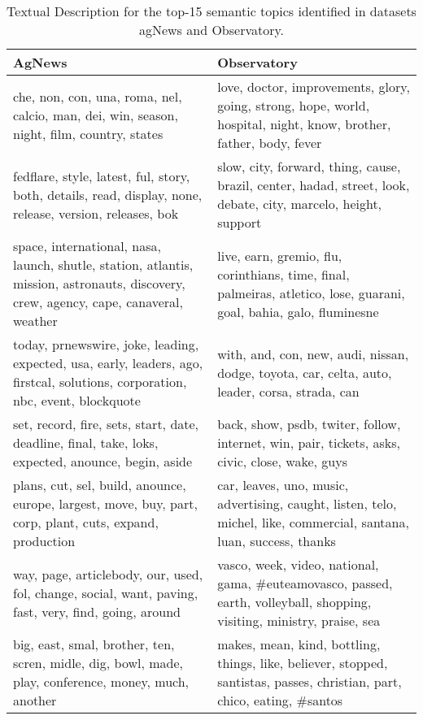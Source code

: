 \begin{table*}
\caption{Textual Description for the top-15 semantic topics identified in datasets agNews and Observatory.}\label{tbl:topicDescriptions}
\centering
	\begin{tiny}
	\begin{tabular}{|p{5.0cm}|p{5.0cm}|}\hline
		\textbf{AgNews}  & \textbf{Observatory} \\ \hline \hline
		
		che, non, con, una, roma, nel, calcio, man, dei, win, season, night, film, country, states  &  love, doctor, improvements, glory, going, strong, hope, world, hospital, night, know, brother, father, body, fever \\ \hline
		fedflare, style, latest, ful, story, both, details, read, display, none, release, version, releases, bok  &  slow, city, forward, thing, cause, brazil, center, hadad, street, look, debate, city, marcelo, height, support \\ \hline
		space, international, nasa, launch, shutle, station, atlantis, mission, astronauts, discovery, crew, agency, cape, canaveral, weather  &  live, earn, gremio, flu, corinthians, time, final, palmeiras, atletico, lose, guarani, goal, bahia, galo, fluminesne \\ \hline
		today, prnewswire, joke, leading, expected, usa, early, leaders, ago, firstcal, solutions, corporation, nbc, event, blockquote  &  with, and, con, new, audi, nissan, dodge, toyota, car, celta, auto, leader, corsa, strada, can \\ \hline
		set, record, fire, sets, start, date, deadline, final, take, loks, expected, anounce, begin, aside  &  back, show, psdb, twiter, follow, internet, win, pair, tickets, asks, civic, close, wake, guys \\ \hline
		plans, cut, sel, build, anounce, europe, largest, move, buy, part, corp, plant, cuts, expand, production  &  car, leaves, uno, music, advertising, caught, listen, telo, michel, like, commercial, santana, luan, success, thanks \\ \hline
		way, page, articlebody, our, used, fol, change, social, want, paving, fast, very, find, going, around  &  vasco, week, video, national, gama, \#euteamovasco, passed, earth, volleyball, shopping, visiting, ministry, praise, sea \\ \hline
		big, east, smal, brother, ten, scren, midle, dig, bowl, made, play, conference, money, much, another  &  makes, mean, kind, bottling, things, like, believer, stopped, santistas, passes, christian, part, chico, eating, \#santos \\ \hline

\end{tabular}
\end{tiny}
\end{table*}
